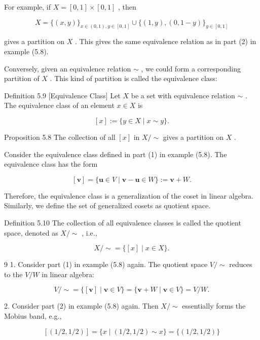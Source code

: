 For example, if \(X = \left\lbrack  {0,1}\right\rbrack   \times  \left\lbrack  {0,1}\right\rbrack\) , then

\[
X = \{ \left( {x,y}\right) {\} }_{x \in  \left( {0,1}\right) ,y \in  \left\lbrack  {0,1}\right\rbrack  } \cup  \{ \left( {1,y}\right) ,\left( {0,1 - y}\right) {\} }_{y \in  \left\lbrack  {0,1}\right\rbrack  }
\]

gives a partition on \(X\) . This gives the same equivalence relation as in part (2) in example (5.8).

Conversely, given an equivalence relation \(\sim\) , we could form a corresponding partition of \(X\) . This kind of partition is called the equivalence class:

Definition 5.9 [Equivalence Class] Let \(X\) be a set with equivalence relation \(\sim\) . The equivalence class of an element \(x \in  X\) is

\[
\left\lbrack  x\right\rbrack   \mathrel{\text{ := }} \{ y \in  X \mid  x \sim  y\} .
\]

Proposition 5.8 The collection of all \(\left\lbrack  x\right\rbrack\) in \(X/ \sim\) gives a partition on \(X\) .

Consider the equivalence class defined in part (1) in example (5.8). The equivalence class has the form

\[
\left\lbrack  \mathbf{v}\right\rbrack   = \{ \mathbf{u} \in  V \mid  \mathbf{v} - \mathbf{u} \in  W\}  \mathrel{\text{ := }} \mathbf{v} + W.
\]

Therefore, the equivalence class is a generalization of the coset in linear algebra. Similarly, we define the set of generalized cosets as quotient space.

Definition 5.10 The collection of all equivalence classes is called the quotient space, denoted as \(X/ \sim\) , i.e.,

\[
X/ \sim   = \{ \left\lbrack  x\right\rbrack   \mid  x \in  X\} .
\]

9 1. Consider part (1) in example (5.8) again. The quotient space \(V/ \sim\) reduces to the \(V/W\) in linear algebra:

\[
V/ \sim   = \{ \left\lbrack  \mathbf{v}\right\rbrack   \mid  \mathbf{v} \in  V\}  = \{ \mathbf{v} + W \mid  \mathbf{v} \in  V\}  = V/W.
\]

2. Consider part (2) in example (5.8) again. Then \(X/ \sim\) essentially forms the Mobius band, e.g.,

\[
\left\lbrack  \left( {1/2,1/2}\right) \right\rbrack   = \{ x \mid  \left( {1/2,1/2}\right)  \sim  x\}  = \{ \left( {1/2,1/2}\right) \}
\]

